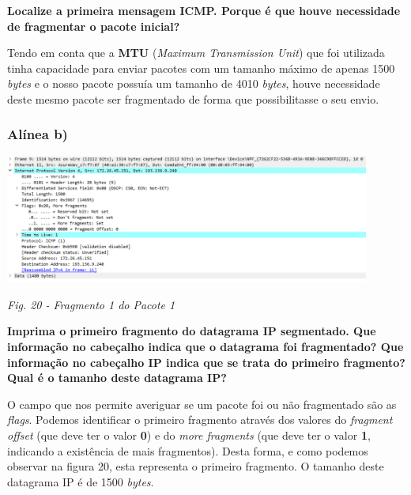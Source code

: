 \documentclass{article}
\begin{document}
\textbf{Localize a primeira mensagem ICMP. Porque é que houve necessidade de fragmentar o pacote inicial?}\par\vspace{0.35cm}
\hspace{0.5cm}Tendo em conta que a \textbf{MTU} (\emph{Maximum Transmission Unit}) que foi utilizada tinha capacidade para enviar pacotes com um tamanho máximo de apenas 1500 \emph{bytes} e o nosso pacote possuía um tamanho de 4010 \emph{bytes}, houve necessidade deste mesmo pacote ser fragmentado de forma que possibilitasse o seu envio.\par\vspace{0.35cm}


\subsubsection{Alínea b)}
\begin{center}
\includegraphics[width=12cm]{hr.png}\par\caption{\textit{Fig. 20 - Fragmento 1 do Pacote 1}}\par\vspace{0.3cm}
\end{center}

\textbf{Imprima o primeiro fragmento do datagrama IP segmentado. Que informação no cabeçalho indica que o
datagrama foi fragmentado? Que informação no cabeçalho IP indica que se trata do primeiro fragmento? Qual é o tamanho deste datagrama IP?}\par\vspace{0.35cm}
\hspace{0.5cm}O campo que nos permite averiguar se um pacote foi ou não fragmentado são as \emph{flags}. Podemos identificar o primeiro fragmento através dos valores do \emph{fragment offset} (que deve ter o valor \textbf{0}) e do \emph{more fragments} (que deve ter o valor \textbf{1}, indicando a existência de mais fragmentos). Desta forma, e como podemos observar na figura 20, esta representa o primeiro fragmento. O tamanho deste datagrama IP é de 1500 \emph{bytes}.\par\clearpage
\end{document}
